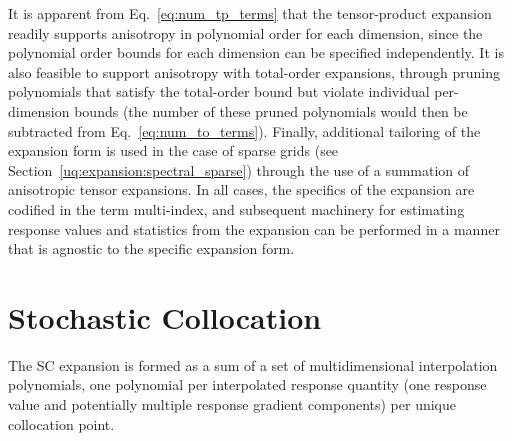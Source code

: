 It is apparent from Eq.~\ref{eq:num_tp_terms} that the tensor-product
expansion readily supports anisotropy in polynomial order for each
dimension, since the polynomial order bounds for each dimension can be
specified independently.  It is also feasible to support anisotropy
with total-order expansions, through pruning polynomials that satisfy 
the total-order bound 
but violate individual per-dimension bounds (the number of these
pruned polynomials would then be subtracted from
Eq.~\ref{eq:num_to_terms}).  Finally, additional tailoring of the
expansion form is used in the case of sparse grids (see
Section~\ref{uq:expansion:spectral_sparse}) through the use of a
summation of anisotropic tensor expansions.
In all cases, the specifics of the expansion are codified in the
term multi-index, and subsequent machinery for estimating response 
values and statistics from the expansion
can be performed in a manner that is agnostic to the specific 
expansion form.


\section{Stochastic Collocation} \label{uq:expansion:sc}


The SC expansion is formed as a sum of a set of multidimensional
interpolation polynomials, one polynomial per interpolated response
quantity (one response value and potentially multiple response
gradient components) per unique collocation point.  

